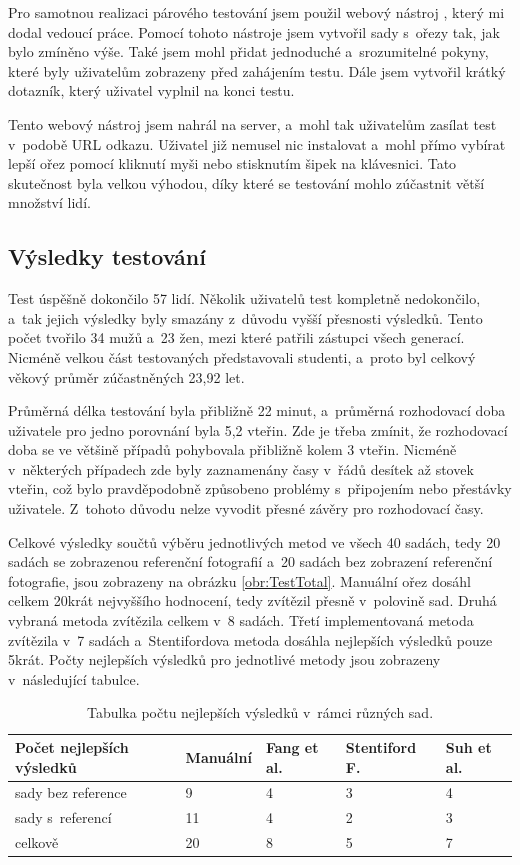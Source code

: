 Pro samotnou realizaci párového testování jsem použil webový nástroj \cite{Sevcik2015}, který mi dodal vedoucí práce. Pomocí tohoto nástroje jsem vytvořil sady s~ořezy tak, jak bylo zmíněno výše. Také jsem mohl přidat jednoduché a~srozumitelné pokyny, které byly uživatelům zobrazeny před zahájením testu. Dále jsem vytvořil krátký dotazník, který uživatel vyplnil na konci testu. 

Tento webový nástroj jsem nahrál na server, a~mohl tak uživatelům zasílat test v~podobě URL odkazu. Uživatel již nemusel nic instalovat a~mohl přímo vybírat lepší ořez pomocí kliknutí myši nebo stisknutím šipek na klávesnici. Tato skutečnost byla velkou výhodou, díky které se testování mohlo zúčastnit větší množství lidí.


\subsection{Výsledky testování}
Test úspěšně dokončilo 57 lidí. Několik uživatelů test kompletně nedokončilo, a~tak jejich výsledky byly smazány z~důvodu vyšší přesnosti výsledků. Tento počet tvořilo 34 mužů a~23 žen, mezi které patřili zástupci všech generací. Nicméně velkou část testovaných představovali studenti, a~proto byl celkový věkový průměr zúčastněných 23,92 let. 

Průměrná délka testování byla přibližně 22 minut, a~průměrná rozhodovací doba uživatele pro jedno porovnání byla 5,2 vteřin. Zde je třeba zmínit, že rozhodovací doba se ve většině případů pohybovala přibližně kolem 3 vteřin. Nicméně v~některých případech zde byly zaznamenány časy v~řádů desítek až stovek vteřin, což bylo pravděpodobně způsobeno problémy s~připojením nebo přestávky uživatele. Z~tohoto důvodu nelze vyvodit přesné závěry pro rozhodovací časy.

Celkové výsledky součtů výběru jednotlivých metod ve všech 40 sadách, tedy 20 sadách se zobrazenou referenční fotografií a~20 sadách bez zobrazení referenční fotografie, jsou zobrazeny na obrázku \ref{obr:TestTotal}. Manuální ořez dosáhl celkem 20krát nejvyššího hodnocení, tedy zvítězil přesně v~polovině sad. Druhá vybraná metoda \cite{Fang2014} zvítězila celkem v~8 sadách. Třetí implementovaná metoda \cite{Suh2003} zvítězila v~7 sadách a~Stentifordova metoda \cite{Stentiford2007} dosáhla nejlepších výsledků pouze 5krát. Počty nejlepších výsledků pro jednotlivé metody jsou zobrazeny v~následující tabulce.

\begin{table}[H]
	\centering
    \begin{tabular}{| l | l | l | l | l |}
    \hline
    Počet nejlepších výsledků& Manuální & Fang et al. \cite{Fang2014} & Stentiford F. \cite{Stentiford2007} & Suh et al. \cite{Suh2003} \\ \hline
    sady bez reference & 9 & 4 & 3 & 4 \\ \hline
    sady s~referencí & 11 & 4 & 2 & 3 \\ \hline
    celkově & 20 & 8 & 5 & 7 \\ 
    \hline
    \end{tabular}
    \caption{Tabulka počtu nejlepších výsledků v~rámci různých sad.}
    \label{tab:test}
\end{table}

